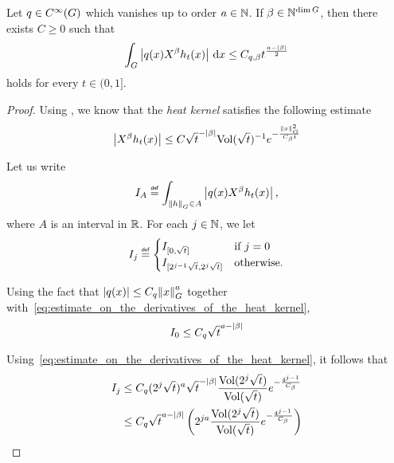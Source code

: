 \begin{lemma}
    Let $q \in \SmoothFunctions \Group$ which vanishes up to order $a \in \N$.
    If $\beta \in \N^{\dim \Group}$,
    then there exists $C \geq 0$ such that
    \begin{align}
        \int_\Group \abs {q(x) \LeftDifferentialOperator \beta h_t(x)} \dd x
        \leq C_{q, \beta} t^{\frac {a - \abs \beta} 2}
    \end{align}
    holds for every $t \in (0, 1]$.
\end{lemma}
\begin{proof}
    Using \cite[Theorem VIII.2.7]{VaropoulosSaloffCosteCoulhon92},
    we know that the \emph{heat kernel} satisfies the following estimate
    \begin{align}
        \abs {\LeftDifferentialOperator \beta h_t(x)} \leq C \sqrt t^{-\abs \beta} \Volume {\sqrt t}^{-1} \e^{-\frac{\norm [\Group] x^2} {C_\beta t}}
        \label{eq:estimate_on_the_derivatives_of_the_heat_kernel}
    \end{align}

    Let us write
    \begin{align*}
        I_A \defeq \int_{\norm [\Group] h \in A} \abs {q(x) \LeftDifferentialOperator \beta h_t(x)},
    \end{align*}
    where $A$ is an interval in $\R$.
    For each $j \in \N$,
    we let
    \begin{align*}
        I_j \defeq
        \begin{cases}
            I_{[0, \sqrt t]} & \text{if } j = 0\\
            I_{[2^{j - 1} \sqrt t, 2^j \sqrt t]} & \text{otherwise}.
        \end{cases}
    \end{align*}

    Using the fact that $\abs {q(x)} \leq C_q \norm [\Group] x^a$
    together with~\eqref{eq:estimate_on_the_derivatives_of_the_heat_kernel},
    \begin{align*}
        I_0 \leq C_q \sqrt t^{a -\abs \beta}
    \end{align*}

    Using~\eqref{eq:estimate_on_the_derivatives_of_the_heat_kernel},
    it follows that
    \begin{align*}
        I_j &\leq C_q (2^j \sqrt t)^a \sqrt t^{-\abs \beta} \frac {\Volume {2^j \sqrt t}} {\Volume {\sqrt t}} \e^{-\frac{4^{j - 1}} {C_\beta}}\\
        &\leq C_q \sqrt t^{a - \abs \beta}
        \left(2^{j a} \frac {\Volume {2^j \sqrt t}} {\Volume {\sqrt t}} \e^{-\frac{4^{j - 1}} {C_\beta}}\right)
    \end{align*}


\end{proof}
